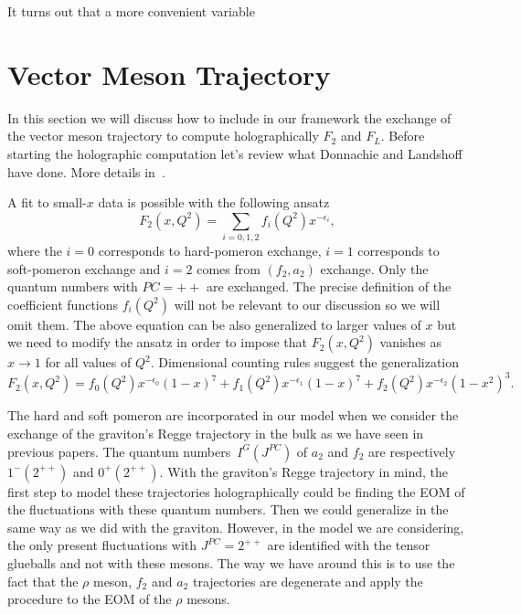 \documentclass[10 pt]{article}
\begin{document}
It turns out that a more convenient variable

\section{Vector Meson Trajectory}

In this section we will discuss how to include in our framework the exchange of the vector meson trajectory to compute holographically $F_2$ and $F_L$. Before starting the holographic computation let's review what Donnachie and Landshoff have done. More details in~\cite{donnachie_dosch_landshoff_nachtmann_2002}.

A fit to small-$x$ data is possible with the following ansatz
\begin{equation}
F_2 \left(x, Q^2\right) = \sum_{i = 0, 1, 2} f_i\left(Q^2\right) x^{- \epsilon_i},
\end{equation}
 where the $i=0$ corresponds to hard-pomeron exchange, $i=1$ corresponds to soft-pomeron exchange and $i = 2$ comes from $(f_2, a_2)$ exchange. Only the quantum numbers with $PC=++$ are exchanged.
 The precise definition of the coefficient functions $f_i\left(Q^2\right)$ will not be relevant to our discussion so we will omit them. The above equation can be also generalized to larger values of $x$ but we need to modify the ansatz in order to impose that $F_2\left(x, Q^2\right)$ vanishes as $x \rightarrow 1$ for all values of $Q^2$. Dimensional counting rules suggest the generalization
\begin{equation}
F_2\left(x, Q^2\right) = f_0 \left(Q^2\right) x^{-\epsilon_0} {\left(1-x\right)}^7 +  f_1 \left(Q^2\right) x^{-\epsilon_1} {\left(1-x\right)}^7 +  f_2 \left(Q^2\right) x^{-\epsilon_2} {\left(1-x^2\right)}^3.
\end{equation} 

The hard and soft pomeron are incorporated in our model when we consider the exchange of the graviton's Regge trajectory in the bulk as we have seen in previous papers. The quantum numbers~$I^G\left(J^{PC}\right)$ of $a_2$ and $f_2$ are respectively $1^{-} \left(2^{++}\right)$ and $0^{+}\left(2^{++}\right)$. With the graviton's Regge trajectory in mind, the first step to model these trajectories holographically could be finding the EOM of the fluctuations with these quantum numbers. Then we could generalize in the same way as we did with the graviton. However, in the model we are considering, the only present fluctuations with $J^{PC} = 2^{++}$ are identified with the tensor glueballs and not with these mesons. The way we have around this is to use the fact that the $\rho$ meson, $f_2$ and $a_2$ trajectories are degenerate and apply the procedure to the EOM of the $\rho$ mesons.
\end{document}
